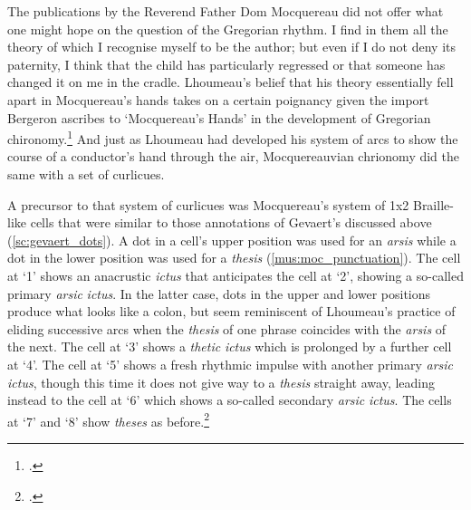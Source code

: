   {\cite[2]{LhoumeauEtudeschantgregorien1907}}
{The publications by the Reverend Father Dom Mocquereau did not offer what one might hope on the question of the Gregorian rhythm. I find in them all the theory of which I recognise myself to be the author; but even if I do not deny its paternity, I think that the child has particularly regressed or that someone has changed it on me in the cradle.}
\noindent
Lhoumeau's belief that his theory essentially fell apart in Mocquereau's hands takes on a certain poignancy given the import Bergeron ascribes to `Mocquereau's Hands' in the \mbox{development} of Gregorian chironomy.\footcite[112--121]{BergeronDecadentEnchantmentsRevival1998}
And just as Lhoumeau had developed his system of arcs to show the course of a conductor's hand through the air, Mocquereauvian chrionomy did the same with a set of curlicues.

A precursor to that system of curlicues was Mocquereau's system of 1x2 Braille-like cells that were similar to those annotations of Gevaert's discussed above (\cref{sc:gevaert_dots}).
A dot in a cell's upper position was used for an \emph{arsis} while a dot in the lower position was used for a \emph{thesis} (\cref{mus:moc_punctuation}).
The cell at `1' shows an anacrustic \emph{ictus} that anticipates the cell at `2', showing a so-called primary \emph{arsic} \emph{ictus}.
In the latter case, dots in the upper and lower positions produce what looks like a colon, but seem reminiscent of Lhoumeau's practice of eliding successive arcs when the \emph{thesis} of one phrase coincides with the \emph{arsis} of the next.
The cell at `3' shows a \emph{thetic} \emph{ictus} which is prolonged by a further cell at `4'.
The cell at `5' shows a fresh rhythmic impulse with another primary \emph{arsic} \emph{ictus}, though this time it does not give way to a \emph{thesis} straight away, leading instead to the cell at `6' which shows a so-called secondary \emph{arsic} \emph{ictus}.
The cells at `7' and `8' show \emph{theses} as before.\footcite[127]{MocquereauNoteponctuationrythmique1897}

